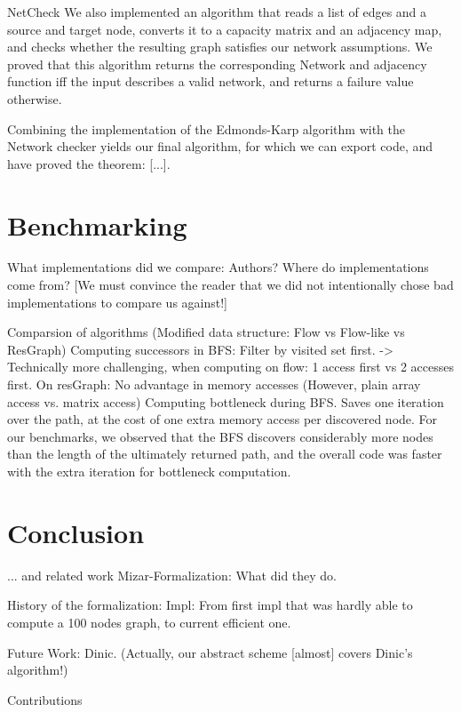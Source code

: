 \documentclass{llncs}
\begin{document}
  NetCheck
    We also implemented an algorithm that reads a list of edges and a source and target node, 
    converts it to a capacity matrix and an adjacency map, and checks whether the resulting graph satisfies our network assumptions.
    We proved that this algorithm returns the corresponding Network and adjacency function iff the input describes a valid network,
    and returns a failure value otherwise.
    
  Combining the implementation of the Edmonds-Karp algorithm with the Network checker yields our final algorithm,
  for which we can export code, and have proved the theorem: [...]. 
    
    

\section{Benchmarking}
  What implementations did we compare: Authors? Where do implementations come from? 
  [We must convince the reader that we did not intentionally chose bad implementations to compare us against!]

  Comparsion of algorithms (Modified data structure: Flow vs Flow-like vs ResGraph)
    Computing successors in BFS: Filter by visited set first.
      -> Technically more challenging, when computing on flow: 1 access first vs 2 accesses first. On resGraph: No advantage in memory accesses (However, plain array access vs. matrix access)
    Computing bottleneck during BFS. Saves one iteration over the path, at the cost of one extra memory access per discovered node.
    For our benchmarks, we observed that the BFS discovers considerably more nodes than the length of the ultimately returned path, 
    and the overall code was faster with the extra iteration for bottleneck computation.
    
    

\section{Conclusion} 
  ... and related work
    Mizar-Formalization: What did they do.
    
    History of the formalization: 
      Impl: From first impl that was hardly able to compute a 100 nodes graph, to current efficient one.
    
    Future Work: Dinic. (Actually, our abstract scheme [almost] covers Dinic's algorithm!)
    


  
Contributions
\end{document}

